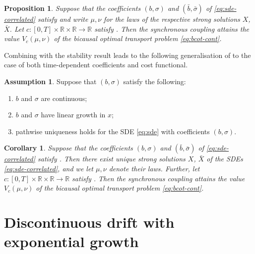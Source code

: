 \documentclass[onseside, final]{amsart}
\newtheorem{proposition}[theorem]{Proposition}
\newtheorem{corollary}[theorem]{Corollary}
\theoremstyle{definition}
\newtheorem{assumption}[theorem]{Assumption}
\newcommand{\R}{\mathbb R}
\numberwithin{equation}{section}
\begin{document}
	\begin{proposition}\label{prop:time-dependent-lipschitz}
		Suppose that the coefficients $(b, \sigma)$ and $(\bar b, \bar \sigma)$ of \eqref{eq:sde-correlated} satisfy  and write $\mu, \nu$ for the laws of the respective strong solutions $X$, $\bar X$. Let $c \colon [0, T] \times \R \times \R \to \R$ satisfy . Then the synchronous coupling attains the value $V_c(\mu, \nu)$ of the bicausal optimal transport problem \eqref{eq:bcot-cont}.
	\end{proposition}
	
	Combining  with the stability result  leads to the following generalisation of \cite[Theorem 1.3, Remark 3.27]{BaKaRo22} to the case of both time-dependent coefficients and cost functional.

	\begin{assumption}\label{ass:regular}
		Suppose that $(b, \sigma)$ satisfy the following:
		\begin{enumerate}[label = (\roman*)]
			\item $b$ and $\sigma$ are continuous;
			\item $b$ and $\sigma$ have linear growth in $x$;
			\item pathwise uniqueness holds for the SDE \eqref{eq:sde} with coefficients $(b, \sigma)$.
		\end{enumerate}
	\end{assumption}
	
	\begin{corollary}\label{cor:regular}
		Suppose that the coefficients $(b, \sigma)$ and $(\bar b, \bar \sigma)$ of \eqref{eq:sde-correlated} satisfy . Then there exist unique strong solutions $X$, $\bar X$ of the SDEs \eqref{eq:sde-correlated}, and we let $\mu, \nu$ denote their laws.
		Further, let $c \colon [0, T] \times \R \times \R \to \R$ satisfy . Then the synchronous coupling attains the value $V_c(\mu, \nu)$ of the bicausal optimal transport problem \eqref{eq:bcot-cont}.
	\end{corollary}
	
	
								
\section{Discontinuous drift with exponential growth}\label{sec:growth-disc}
\end{document}
